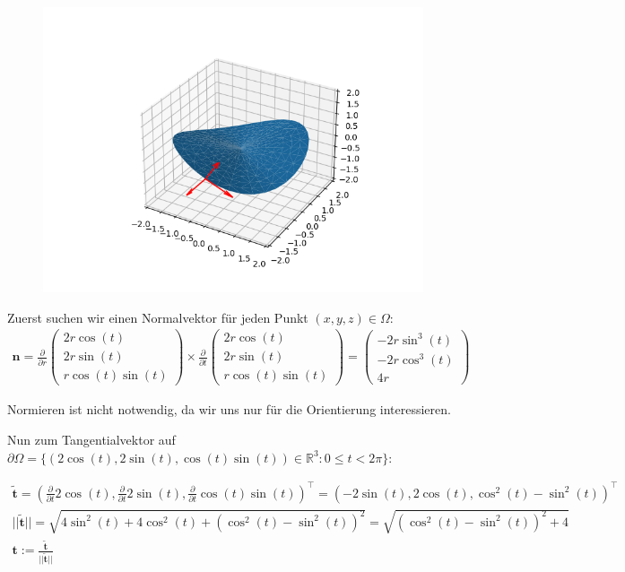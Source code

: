 \documentclass[]{article}
\begin{document}
\begin{figure}[h!]
	\center
	\includegraphics[width=0.7\columnwidth]{bsp_7.png}
\end{figure}

Zuerst suchen wir einen Normalvektor für jeden Punkt $(x,y,z)\in \Omega$:
\begin{align*}
	\bm{n} = \frac{\partial}{\partial r}\begin{pmatrix} 2r\cos(t)\\ 2r\sin(t)\\ r\cos(t)\sin(t) \end{pmatrix} \times \frac{\partial}{\partial t}\begin{pmatrix}
	2r\cos(t)\\ 2r\sin(t)\\ r\cos(t)\sin(t) \end{pmatrix} = \begin{pmatrix}
	-2r\sin^3(t)\\ -2r\cos^3(t)\\ 4r \end{pmatrix}
\end{align*}

Normieren ist nicht notwendig, da wir uns nur für die Orientierung interessieren. 

Nun zum Tangentialvektor auf $\partial\Omega = \{(2\cos(t), 2\sin(t), \cos(t)\sin(t))\in \mathbb{R}^3: 0 \leq t < 2\pi\}$:

\begin{align*}
	\tilde{\bm{t}} = \left(\frac{\partial}{\partial t} 2\cos(t), \frac{\partial}{\partial t} 2\sin(t), \frac{\partial}{\partial t} \cos(t)\sin(t)\right)^\top = (-2\sin(t), 2\cos(t), \cos^2(t)-\sin^2(t))^\top\\
	||\tilde{\bm{t}}|| = \sqrt{4\sin^2(t)+4\cos^2(t)+(\cos^2(t)-\sin^2(t))^2} = \sqrt{(\cos^2(t)-\sin^2(t))^2 + 4}\\
	\bm{t} := \frac{\tilde{\bm{t}}}{||\tilde{\bm{t}}||}
\end{align*}
\end{document}
